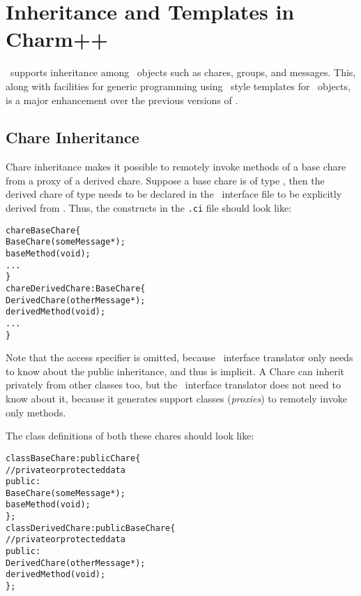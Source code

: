 \section{Inheritance and Templates in Charm++}
\label{inheritance and templates}

\charmpp\ supports inheritance among \charmpp\ objects such as
chares, groups, and messages. This, along with facilities for generic
programming using \CC\ style templates for \charmpp\ objects, is a
major enhancement over the previous versions of \charmpp.

\subsection{Chare Inheritance}

Chare inheritance makes it possible to remotely invoke methods of a base
chare  from a proxy of a derived
chare. Suppose a base chare is of type 
, then the derived chare of type  needs to be
declared in the \charmpp\ interface file to be explicitly derived from
. Thus, the constructs in the \texttt{.ci} file should look like:

\begin{alltt}
  chare BaseChare \{
    BaseChare(someMessage *);
    baseMethod(void);
    ...
  \}
  chare DerivedChare : BaseChare \{
    DerivedChare(otherMessage *);
    derivedMethod(void);
    ...
  \}
\end{alltt}

Note that the access specifier  is omitted, because \charmpp\
interface translator only needs to know about the public inheritance,
and thus \kw{public} is implicit. A Chare can inherit privately from other
classes too, but the \charmpp\ interface translator does not need to know
about it, because it generates support classes ({\em proxies}) to remotely
invoke only \kw{public} methods.

The class definitions of both these chares should look like:

\begin{alltt}
  class BaseChare : public Chare \{
    // private or protected data
    public:
      BaseChare(someMessage *);
      baseMethod(void);
  \};
  class DerivedChare : public BaseChare \{
    // private or protected data
    public:
      DerivedChare(otherMessage *);
      derivedMethod(void);
  \};
\end{alltt}

